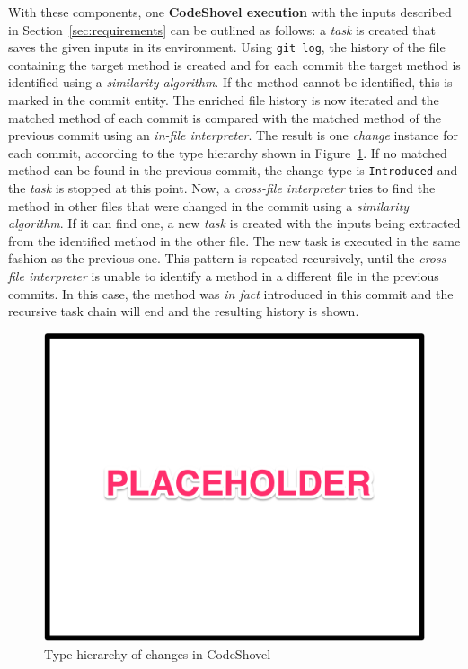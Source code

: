 With these components, one \textbf{CodeShovel execution} with the inputs described in Section~\ref{sec:requirements} can be outlined as follows: a \textit{task} is created that saves the given inputs in its environment. Using \texttt{git log}, the history of the file containing the target method is created and for each commit the target method is identified using a \textit{similarity algorithm}. If the method cannot be identified, this is marked in the commit entity. The enriched file history is now iterated and the matched method of each commit is compared with the matched method of the previous commit using an \textit{in-file interpreter}. The result is one \textit{change} instance for each commit, according to the type hierarchy shown in Figure~\ref{fig:changes_hierarchy}. If no matched method can be found in the previous commit, the change type is \texttt{Introduced} and the \textit{task} is stopped at this point. Now, a \textit{cross-file interpreter} tries to find the method in other files that were changed in the commit using a \textit{similarity algorithm}. If it can find one, a new \textit{task} is created with the inputs being extracted from the identified method in the other file. The new task is executed in the same fashion as the previous one. This pattern is repeated recursively, until the \textit{cross-file interpreter} is unable to identify a method in a different file in the previous commits. In this case, the method was \textit{in fact} introduced in this commit and the recursive task chain will end and the resulting history is shown.

\begin{figure}[t!]
  \includegraphics[width=0.98\columnwidth]{figures/changes_hierarchy}
  \caption{Type hierarchy of changes in CodeShovel}
  \label{fig:changes_hierarchy}
\end{figure}

